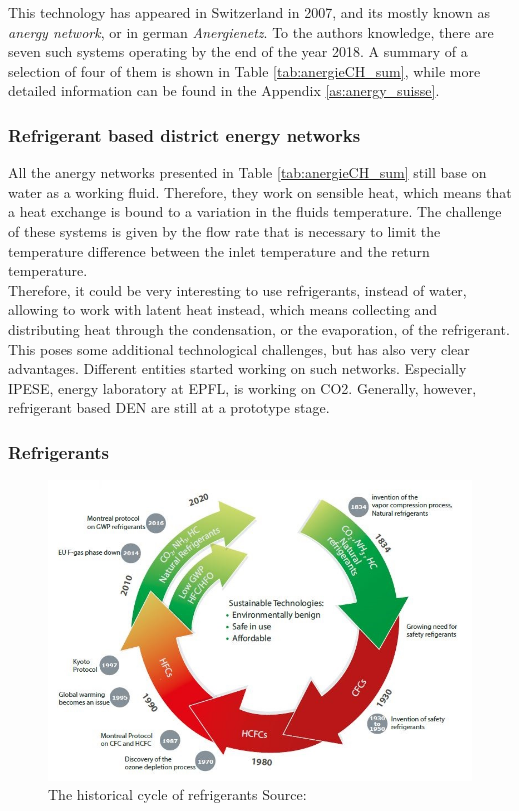 \documentclass{article}
\begin{document}
This technology has appeared in Switzerland in 2007, and its mostly known as \textit{anergy network}, or in german \textit{Anergienetz}. To the authors knowledge, there are seven such systems operating by the end of the year 2018\cite{energieschweizFallbeispieleThermischeNetze2018}. A summary of a selection of four of them is shown in Table \ref{tab:anergieCH_sum}, while more detailed information can be found in the Appendix \ref{as:anergy_suisse}.



\subsubsection{Refrigerant based district energy networks}
All the anergy networks presented in Table \ref{tab:anergieCH_sum} still base on water as a working fluid. Therefore, they work on sensible heat, which means that a heat exchange is bound to a variation in the fluids temperature. The challenge of these systems is given by the flow rate that is necessary to limit the temperature difference between the inlet temperature and the return temperature.\\
Therefore, it could be very interesting to use refrigerants, instead of water, allowing to work with latent heat instead, which means collecting and distributing heat through the condensation, or the evaporation, of the refrigerant. This poses some additional technological challenges, but has also very clear advantages.
Different entities started working on such networks. Especially IPESE, energy laboratory at EPFL, is working on CO2. Generally, however, refrigerant based DEN are still at a prototype stage.

\subsubsection{Refrigerants}

\begin{figure}[h!]
\centering
\includegraphics[width=1\textwidth]{refrigerants.JPG}
\caption{The historical cycle of refrigerants Source: \cite{danfossRefrigerantOptionsNow2017}}
\label{fig:refrigerants}
\end{figure}
\end{document}
